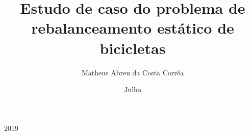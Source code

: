 \documentclass{projetofinal-dcc}
\begin{document}
\title{Estudo de caso do problema de rebalanceamento est{\'a}tico de
bicicletas}

\author{Matheus Abreu da
Costa Corr{\^e}a}{}





\date{Julho}{2019}
\maketitle

\startdocument
\makethankspage

\begin{abstract}{
  
}
\end{abstract}

\begin{englishabstract}{
  
}
\end{englishabstract}

\makefigurespage

\maketablespage

\makelistingspage
\end{document}
